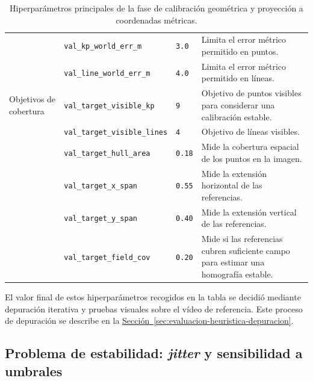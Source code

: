 \begin{table}[htbp]
\begin{tabularx}{\textwidth}{
>{\raggedright\arraybackslash}p{2.5cm}
>{\raggedright\arraybackslash}p{3.3cm}
>{\raggedright\arraybackslash}p{1.4cm}
>{\raggedright\arraybackslash}X
}
&
\texttt{val\_kp\_world\_err\_m} &
\texttt{3.0} &
Limita el error métrico permitido en puntos. \\

&
\texttt{val\_line\_world\_err\_m} &
\texttt{4.0} &
Limita el error métrico permitido en líneas. \\

\midrule

Objetivos de cobertura &
\texttt{val\_target\_visible\_kp} &
\texttt{9} &
Objetivo de puntos visibles para considerar una calibración estable. \\

&
\texttt{val\_target\_visible\_lines} &
\texttt{4} &
Objetivo de líneas visibles. \\

&
\texttt{val\_target\_hull\_area} &
\texttt{0.18} &
Mide la cobertura espacial de los puntos en la imagen. \\

&
\texttt{val\_target\_x\_span} &
\texttt{0.55} &
Mide la extensión horizontal de las referencias. \\

&
\texttt{val\_target\_y\_span} &
\texttt{0.40} &
Mide la extensión vertical de las referencias. \\

&
\texttt{val\_target\_field\_cov} &
\texttt{0.20} &
Mide si las referencias cubren suficiente campo para estimar una homografía estable. \\

\bottomrule
\end{tabularx}

\caption[Hiperparámetros de calibración y proyección métrica]{
Hiperparámetros principales de la fase de calibración geométrica y proyección a coordenadas métricas.}
\label{tab:hiperparametros-referencia}
\end{table}

El valor final de estos hiperparámetros recogidos en la tabla se decidió mediante depuración iterativa y pruebas visuales sobre el vídeo de referencia. Este proceso de depuración se describe en la \hyperref[sec:evaluacion-heuristica-depuracion]{Sección~\ref*{sec:evaluacion-heuristica-depuracion}}.

\subsection{Problema de estabilidad: \textit{jitter} y sensibilidad a umbrales}

